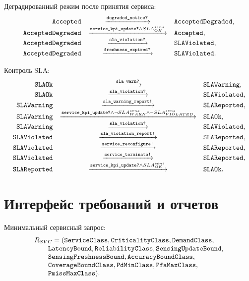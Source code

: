 \documentclass[10pt,a4paper]{article}
\newcommand{\code}[1]{\ifmmode\text{\ttfamily\detokenize{#1}}\else\texttt{\detokenize{#1}}\fi}
\begin{document}
Деградированный режим после принятия сервиса:
\[
\begin{array}{rcl}
\code{Accepted} & \xrightarrow{\code{degraded_notice?}} & \code{AcceptedDegraded},\\
\code{AcceptedDegraded} & \xrightarrow{\code{service_kpi_update?}\land SLA^{sens}_{OK}} & \code{Accepted},\\
\code{AcceptedDegraded} & \xrightarrow{\code{sla_violation?}} & \code{SLAViolated},\\
\code{AcceptedDegraded} & \xrightarrow{\code{freshness_expired?}} & \code{SLAViolated}.
\end{array}
\]

Контроль SLA:
\[
\begin{array}{rcl}
\code{SLAOk} & \xrightarrow{\code{sla_warn?}} & \code{SLAWarning},\\
\code{SLAOk} & \xrightarrow{\code{sla_violation?}} & \code{SLAViolated},\\
\code{SLAWarning} & \xrightarrow{\code{sla_warning_report!}} & \code{SLAReported},\\
\code{SLAWarning} & \xrightarrow{\code{service_kpi_update?}\land \neg SLA^{sens}_{WARN}\land \neg SLA^{sens}_{VIOLATED}} & \code{SLAOk},\\
\code{SLAWarning} & \xrightarrow{\code{sla_violation?}} & \code{SLAViolated},\\
\code{SLAViolated} & \xrightarrow{\code{sla_violation_report!}} & \code{SLAReported},\\
\code{SLAViolated} & \xrightarrow{\code{service_reconfigure!}} & \code{SLAReported},\\
\code{SLAViolated} & \xrightarrow{\code{service_terminate!}} & \code{SLAReported},\\
\code{SLAReported} & \xrightarrow{\code{service_kpi_update?}\land SLA^{sens}_{OK}} & \code{SLAOk}.
\end{array}
\]

\section{Интерфейс требований и отчетов}

Минимальный сервисный запрос:
\[
\begin{array}{l}
R_{SVC}=(\code{ServiceClass},\code{CriticalityClass},\code{DemandClass},\\
\qquad \code{LatencyBound},\code{ReliabilityClass},\code{SensingUpdateBound},\\
\qquad \code{SensingFreshnessBound},\code{AccuracyBoundClass},\\
\qquad \code{CoverageBoundClass},\code{PdMinClass},\code{PfaMaxClass},\\
\qquad \code{PmissMaxClass}).
\end{array}
\]
\end{document}
